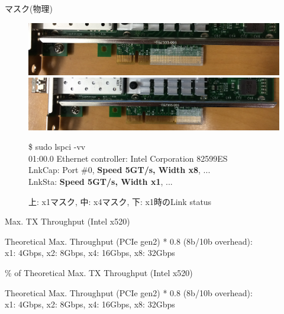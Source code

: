 \documentclass[10pt, compress]{beamer}
\begin{document}
\begin{frame}{マスク(物理)}

\begin{figure}
\includegraphics[width=.9\textwidth]{pic/x1.png} \\
\includegraphics[width=.9\textwidth]{pic/x4.png}

\begin{scriptsize}
\begin{tcolorbox}[width=.9\linewidth]
\$ sudo lspci -vv\\
01:00.0 Ethernet controller: Intel Corporation 82599ES\\
LnkCap: Port \#0, \textbf{Speed 5GT/s, Width x8}, ... \\
LnkSta: \textbf{Speed 5GT/s, Width x1}, ...
\end{tcolorbox}
\end{scriptsize}
\vspace{-.5em}
\small{上: x1マスク, 中: x4マスク, 下: x1時のLink status}
\end{figure}


\end{frame}


\begin{frame}{Max. TX Throughput (Intel x520)}
	\begin{figure}
		\resizebox{.7\textwidth}{!}{}
	\end{figure}
	{\footnotesize Theoretical Max. Throughput (PCIe gen2) * 0.8 (8b/10b overhead): \\
	x1: 4Gbps, x2: 8Gbps, x4: 16Gbps, x8: 32Gbps}
\end{frame}


\begin{frame}{\% of Theoretical Max. TX Throughput (Intel x520)}
	\begin{figure}
		\resizebox{.7\textwidth}{!}{}
	\end{figure}
	{\footnotesize Theoretical Max. Throughput (PCIe gen2) * 0.8 (8b/10b overhead): \\
	x1: 4Gbps, x2: 8Gbps, x4: 16Gbps, x8: 32Gbps}
\end{frame}
\end{document}
